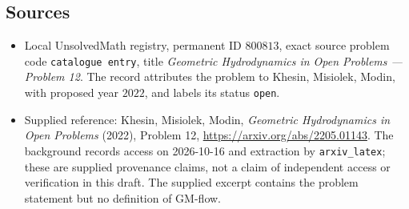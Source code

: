 \documentclass[11pt]{article}
\begin{document}
\subsection{Sources}
\begin{itemize}
\item Local UnsolvedMath registry, permanent ID \(800813\), exact source problem code \texttt{catalogue entry}, title \emph{Geometric Hydrodynamics in Open Problems --- Problem 12}. The record attributes the problem to Khesin, Misiolek, Modin, with proposed year \(2022\), and labels its status \texttt{open}.
\item Supplied reference: Khesin, Misiolek, Modin, \emph{Geometric Hydrodynamics in Open Problems} (2022), Problem 12, \url{https://arxiv.org/abs/2205.01143}. The background records access on 2026-10-16 and extraction by \texttt{arxiv\_latex}; these are supplied provenance claims, not a claim of independent access or verification in this draft. The supplied excerpt contains the problem statement but no definition of GM-flow.
\end{itemize}
\end{document}
